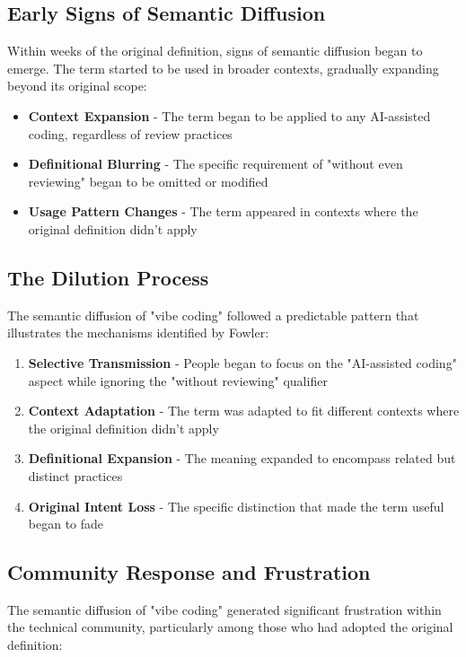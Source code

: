\documentclass[11pt]{article}
\begin{document}
\subsection{Early Signs of Semantic Diffusion}

Within weeks of the original definition, signs of semantic diffusion began to emerge. The term started to be used in broader contexts, gradually expanding beyond its original scope:

\begin{itemize}
\item \textbf{Context Expansion} - The term began to be applied to any AI-assisted coding, regardless of review practices
\item \textbf{Definitional Blurring} - The specific requirement of "without even reviewing" began to be omitted or modified
\item \textbf{Usage Pattern Changes} - The term appeared in contexts where the original definition didn't apply
\end{itemize}

\subsection{The Dilution Process}

The semantic diffusion of "vibe coding" followed a predictable pattern that illustrates the mechanisms identified by Fowler:

\begin{enumerate}
\item \textbf{Selective Transmission} - People began to focus on the "AI-assisted coding" aspect while ignoring the "without reviewing" qualifier
\item \textbf{Context Adaptation} - The term was adapted to fit different contexts where the original definition didn't apply
\item \textbf{Definitional Expansion} - The meaning expanded to encompass related but distinct practices
\item \textbf{Original Intent Loss} - The specific distinction that made the term useful began to fade
\end{enumerate}

\subsection{Community Response and Frustration}

The semantic diffusion of "vibe coding" generated significant frustration within the technical community, particularly among those who had adopted the original definition:
\end{document}
